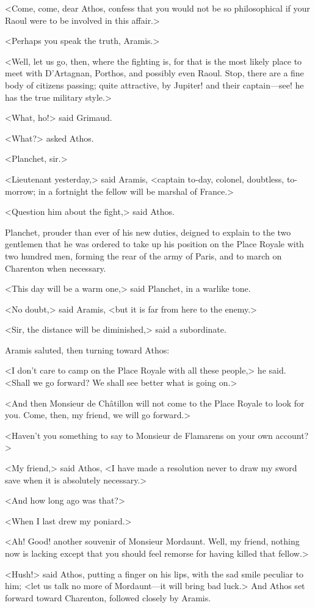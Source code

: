 <Come, come, dear Athos, confess that you would not be so philosophical if your Raoul were to be involved in this affair.>

<Perhaps you speak the truth, Aramis.>

<Well, let us go, then, where the fighting is, for that is the most likely place to meet with D'Artagnan, Porthos, and possibly even Raoul. Stop, there are a fine body of citizens passing; quite attractive, by Jupiter! and their captain—see! he has the true military style.>

<What, ho!> said Grimaud.

<What?> asked Athos.

<Planchet, sir.>

<Lieutenant yesterday,> said Aramis, <captain to-day, colonel, doubtless, to-morrow; in a fortnight the fellow will be marshal of France.>

<Question him about the fight,> said Athos.

Planchet, prouder than ever of his new duties, deigned to explain to the two gentlemen that he was ordered to take up his position on the Place Royale with two hundred men, forming the rear of the army of Paris, and to march on Charenton when necessary.

<This day will be a warm one,> said Planchet, in a warlike tone.

<No doubt,> said Aramis, <but it is far from here to the enemy.>

<Sir, the distance will be diminished,> said a subordinate.

Aramis saluted, then turning toward Athos:

<I don't care to camp on the Place Royale with all these people,> he said. <Shall we go forward? We shall see better what is going on.>

<And then Monsieur de Châtillon will not come to the Place Royale to look for you. Come, then, my friend, we will go forward.>

<Haven't you something to say to Monsieur de Flamarens on your own account?>

<My friend,> said Athos, <I have made a resolution never to draw my sword save when it is absolutely necessary.>

<And how long ago was that?>

<When I last drew my poniard.>

<Ah! Good! another souvenir of Monsieur Mordaunt. Well, my friend, nothing now is lacking except that you should feel remorse for having killed that fellow.>

<Hush!> said Athos, putting a finger on his lips, with the sad smile peculiar to him; <let us talk no more of Mordaunt—it will bring bad luck.> And Athos set forward toward Charenton, followed closely by Aramis. 